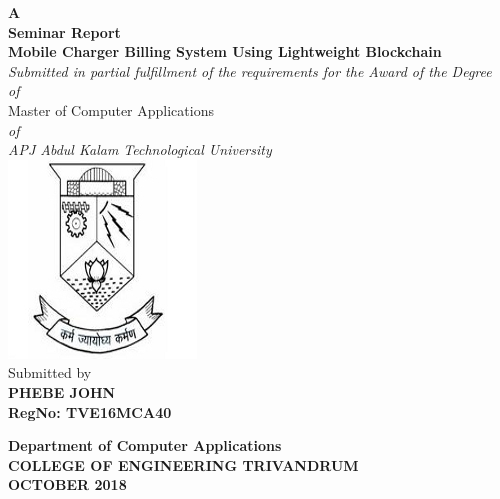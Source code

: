 \begin{titlepage}
\begin{center}
\textbf{ A  }\\
\vspace{0.35cm}
\textbf{ Seminar Report}\\
\vspace{0.55cm}
\textbf{\Large{Mobile Charger Billing System Using
Lightweight Blockchain}}\\ \vspace{0.2cm}
\normalsize
\vspace{0.5cm}
\emph{Submitted in partial fulfillment of the requirements for the Award of the Degree}\\
\vspace{0.35cm}
\emph{of}\\
\vspace{0.35cm}
Master of Computer Applications\\
\vspace{0.35cm}
\emph{of}\\
\vspace{0.35cm}
\emph{ {APJ Abdul Kalam Technological University} }\\
\normalsize
\vspace{0.5cm}
\includegraphics[height=0.30\textwidth]{./logo}\\
\vspace{0.3cm}
Submitted by\\
\vspace{0.3cm}
\textbf{PHEBE JOHN}\\
\vspace{0.5cm}
\textbf{RegNo: TVE16MCA40 }\\
\vspace{1.8cm}

\normalsize
\textbf{Department of Computer Applications}\\[0.3cm]
\textbf{COLLEGE OF ENGINEERING TRIVANDRUM}\\[0.4cm]
\textbf{OCTOBER 2018}\\
\end{center}
\end{titlepage}

